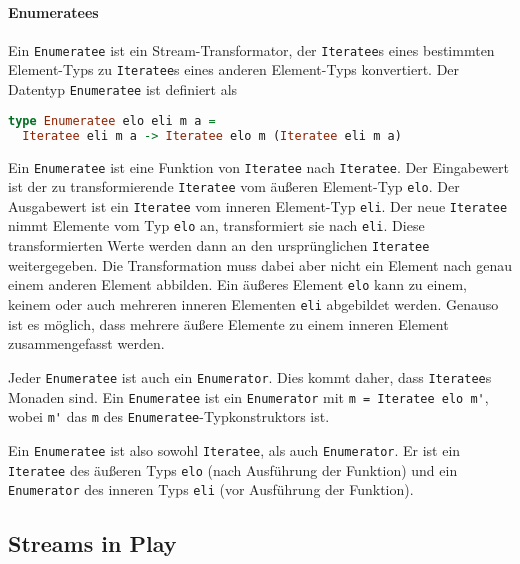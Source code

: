 \documentclass[draft=false
              ,paper=a4
              ,twoside=false
              ,fontsize=11pt
              ,headsepline
              ,BCOR10mm
              ,DIV11
              ]{scrbook}
\begin{document}
\paragraph{Enumeratees} %
\label{par:enumeratees}\mbox{} %

Ein \lstinline|Enumeratee| ist ein Stream-Transformator, der \lstinline|Iteratee|s eines bestimmten Element-Typs zu \lstinline|Iteratee|s eines anderen Element-Typs konvertiert.
Der Datentyp \lstinline|Enumeratee| ist definiert als
\begin{lstlisting}[language=Haskell]
type Enumeratee elo eli m a =
  Iteratee eli m a -> Iteratee elo m (Iteratee eli m a)
\end{lstlisting}

Ein \lstinline|Enumeratee| ist eine Funktion von \lstinline|Iteratee| nach \lstinline|Iteratee|.
Der Eingabewert ist der zu transformierende \lstinline|Iteratee| vom äußeren Element-Typ \lstinline|elo|.
Der Ausgabewert ist ein \lstinline|Iteratee| vom inneren Element-Typ \lstinline|eli|.
Der neue \lstinline|Iteratee| nimmt Elemente vom Typ \lstinline|elo| an, transformiert sie nach \lstinline|eli|.
Diese transformierten Werte werden dann an den ursprünglichen \lstinline|Iteratee| weitergegeben.
Die Transformation muss dabei aber nicht ein Element nach genau einem anderen Element abbilden.
Ein äußeres Element \lstinline|elo| kann zu einem, keinem oder auch mehreren inneren Elementen \lstinline|eli| abgebildet werden.
Genauso ist es möglich, dass mehrere äußere Elemente zu einem inneren Element zusammengefasst werden.

Jeder \lstinline|Enumeratee| ist auch ein \lstinline|Enumerator|.
Dies kommt daher, dass \lstinline|Iteratee|s Monaden sind.
Ein \lstinline|Enumeratee| ist ein \lstinline|Enumerator| mit \lstinline|m = Iteratee elo m'|, wobei \lstinline|m'| das \lstinline|m| des \lstinline|Enumeratee|-Typkonstruktors ist.

Ein \lstinline|Enumeratee| ist also sowohl \lstinline|Iteratee|, als auch \lstinline|Enumerator|.
Er ist ein \lstinline|Iteratee| des äußeren Typs \lstinline|elo| (nach Ausführung der Funktion) und ein \lstinline|Enumerator| des inneren Typs \lstinline|eli| (vor Ausführung der Funktion).







\subsection{Streams in Play} %
\label{sub:streams_in_play}
\end{document}

